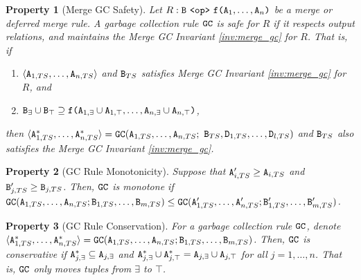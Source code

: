 \documentclass{article}
\numberwithin{equation}{section}
\newtheorem{property}{Property}[section]
\renewcommand{\tt}[1]{\ifmmode\text{\texttt{#1}}\else\texttt{#1}\fi}
\begin{document}
\begin{property}[Merge GC Safety]
\label{property:gc_safety}
Let $R: \tt{B} ~\tt{<op>}~ \tt{f(}\tt{A}_1,\dots,\tt{A}_n\tt{)}$ be a merge or deferred merge rule.
A garbage collection rule $\tt{GC}$ is safe for $R$ if it respects output relations, and maintains the Merge GC Invariant \ref{inv:merge_gc} for $R$.
That is, if
\begin{enumerate}
\item $\langle \tt{A}_{1,TS}, \dots, \tt{A}_{n,TS} \rangle$ and $\tt{B}_{TS}$ satisfies Merge GC Invariant \ref{inv:merge_gc} for $R$, and
\item $\tt{B}_\exists \cup \tt{B}_\top \supseteq \tt{f}\tt{(}\tt{A}_{1,\exists} \cup \tt{A}_{1,\top},\dots,\tt{A}_{n,\exists} \cup \tt{A}_{n,\top}\tt{)}$,
\end{enumerate}
then $\langle \tt{A}_{1,TS}^*, \dots, \tt{A}_{n,TS}^* \rangle = \tt{GC}(\tt{A}_{1,TS}, \dots, \tt{A}_{n,TS};$ $\tt{B}_{TS}, \tt{D}_{1,TS}, \dots, \tt{D}_{l,TS})$ and $\tt{B}_{TS}$ also satisfies the Merge GC Invariant \ref{inv:merge_gc}.
\end{property}

\begin{property}[GC Rule Monotonicity]
Suppose that $\tt{A}'_{i,TS} \geq \tt{A}_{i,TS}$ and $\tt{B}'_{j,TS} \geq \tt{B}_{j,TS}$.
Then, $\tt{GC}$ is \emph{monotone} if $\tt{GC}(\tt{A}_{1,TS}, \dots, \tt{A}_{n,TS}; \tt{B}_{1,TS}, \dots, \tt{B}_{m,TS}) \leq \tt{GC}(\tt{A}'_{1,TS}, \dots, \tt{A}'_{n,TS}; \tt{B}'_{1,TS}, \dots, \tt{B}'_{m,TS})$.
\end{property}

\begin{property}[GC Rule Conservation]
\label{property:gc_conservative}
For a garbage collection rule $\tt{GC}$, denote
$\langle \tt{A}_{1,TS}^*, \dots, \tt{A}_{n,TS}^* \rangle = \tt{GC}(\tt{A}_{1,TS}, \dots, \tt{A}_{n,TS}; \tt{B}_{1,TS}, \dots, \tt{B}_{m,TS})$.
Then, $\tt{GC}$ is \emph{conservative} if $\tt{A}_{j,\exists}^* \subseteq \tt{A}_{j,\exists}$ and $\tt{A}_{j,\exists}^* \cup \tt{A}_{j,\top}^* = \tt{A}_{j,\exists} \cup \tt{A}_{j,\top}$ for all $j=1,\dots,n$.
That is, $\tt{GC}$ only moves tuples from $\exists$ to $\top$.
\end{property}
\end{document}
